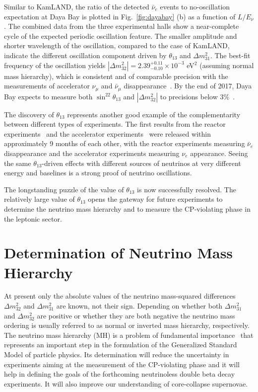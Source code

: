 \documentclass[aps,twocolumn,preprintnumbers,amsmath,superscriptaddress,amssymb,floats,nofootinbib]{revtex4-1}
\begin{document}
Similar to KamLAND, the ratio of the detected $\bar\nu_{e}$ events to no-oscillation expectation at Daya Bay is plotted in Fig.~\ref{fig:dayabay} (b) as a function of $L/E_{\nu}$. 
The combined data from the three experimental halls show a near-complete cycle of the expected periodic oscillation feature. 
The smaller amplitude and shorter wavelength of the oscillation, compared to the case of KamLAND, indicate the different oscillation component driven by $\theta_{13}$ and $\Delta{m}^2_{31}$. 
The best-fit frequency of the oscillation yields $|\Delta{m}^2_{32}| = 2.39^{+0.11}_{-0.10} \times 10^{-3}$ eV$^2$ (assuming normal mass hierarchy), which is consistent and of comparable precision with the measurements of accelerator $\nu_\mu$ and $\bar\nu_\mu$ disappearance~\cite{MINOS2014,T2K2014}. 
By the end of 2017, Daya Bay expects to measure both $\sin^22\theta_{13}$ and $|\Delta{m}^2_{32}|$ to precisions below 3\%~\cite{Zhang-Neutrino14}.

The discovery of $\theta_{13}$ represents another good example of the complementarity between different types of experiments. The first results from the reactor experiments~\cite{DChooz,Dayabay,Reno} and the accelerator experiments~\cite{T2K2011,MINOS2011} were released within approximately 9 months of each other, with the reactor experiments measuring $\bar\nu_e$ disappearance and the accelerator experiments measuring $\nu_e$ appearance. Seeing the same $\theta_{13}$-driven effects with different sources 
of neutrinos at very different energy and baselines is a strong proof of neutrino oscillations.

The longstanding puzzle of the value of $\theta_{13}$ is now successfully resolved.
The relatively large value of $\theta_{13}$ opens the gateway for future experiments to determine the neutrino mass hierarchy and 
to measure the CP-violating phase in the leptonic sector.


\section{Determination of Neutrino Mass Hierarchy}

At present only the absolute values of the neutrino mass-squared differences $\Delta m^2_{32}$ and $\Delta m^2_{31}$ are known, not their sign.
Depending on whether both $\Delta m^2_{31}$ and $\Delta m^2_{32}$ are positive or whether they are both negative the neutrino mass ordering is usually referred to as normal or inverted mass hierarchy, respectively.
The neutrino mass hierarchy (MH) is a problem of fundamental importance~\cite{MHwhitepaper} that represents an important step in the formulation of the Generalized Standard Model of particle physics.
Its determination will reduce the uncertainty in experiments aiming at the measurement of the CP-violating phase 
and it will help in defining the goals of the forthcoming neutrinoless double beta decay experiments.
It will also improve our understanding of core-collapse supernovae.
\end{document}
